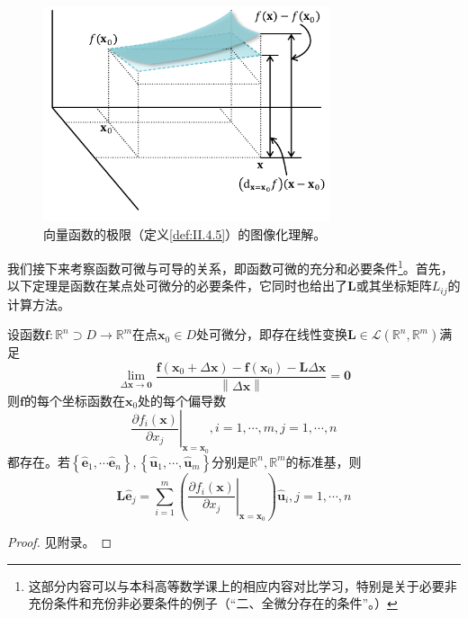 \documentclass[main.tex]{subfiles}
\begin{document}
\begin{figure}[ht]
    \centering
    \includegraphics[width=0.75\textwidth]{images/II.4.7.pdf}
    \caption{向量函数的极限（定义\ref{def:II.4.5}）的图像化理解。}
    \label{fig:II.4.7}
\end{figure}

我们接下来考察函数可微与可导的关系，即函数可微的充分和必要条件\footnote{这部分内容可以与本科高等数学课上的相应内容对比学习，特别是关于必要非充份条件和充份非必要条件的例子（“二、全微分存在的条件”\cite[p.~20]{华工高数2009下}。）}。首先，以下定理是函数在某点处可微分的必要条件，它同时也给出了$\mathbf{L}$或其坐标矩阵$L_{ij}$的计算方法。

\begin{theorem}\label{thm:II.4.7}
    设函数$\mathbf{f}:\mathbb{R}^n\supset D\rightarrow\mathbb{R}^m$在点$\mathbf{x}_0\in D$处可微分，即存在线性变换$\mathbf{L}\in\mathcal{L}\left(\mathbb{R}^n,\mathbb{R}^m\right)$满足
    \[
        \lim_{\Delta\mathbf{x}\to\mathbf{0}}\frac{\mathbf{f}\left(\mathbf{x}_0+\Delta \mathbf{x}\right)-\mathbf{f}\left(\mathbf{x}_0\right)-\mathbf{L}\Delta\mathbf{x}}{\left\|\Delta\mathbf{x}\right\|}=\mathbf{0}
    \]
    则$\mathbf{f}$的每个坐标函数在$\mathbf{x}_0$处的每个偏导数
    \[
        \left.\frac{\partial f_i\left(\mathbf{x}\right)}{\partial x_j}\right|_{\mathbf{x}=\mathbf{x}_0},i=1,\cdots,m,j=1,\cdots,n
    \]
    都存在。若$\left\{\mathbf{\hat{e}}_1,\cdots\mathbf{\hat{e}}_n\right\},\left\{\mathbf{\hat{u}}_1,\cdots,\mathbf{\hat{u}}_m\right\}$分别是$\mathbb{R}^n,\mathbb{R}^m$的标准基，则
    \[
        \mathbf{L\hat{e}}_j=\sum_{i=1}^m\left(\left.\frac{\partial f_i\left(\mathbf{x}\right)}{\partial x_j}\right|_{\mathbf{x}=\mathbf{x}_0}\right)\mathbf{\hat{u}}_i,j=1,\cdots,n
    \]
\end{theorem}
\begin{proof}
    见附录。
\end{proof}
\end{document}
